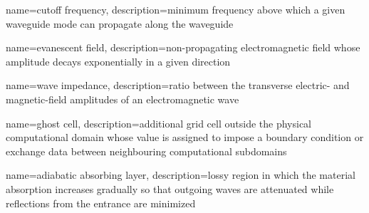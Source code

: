 { name={cutoff frequency}, description={minimum frequency above which a given waveguide mode can propagate along the waveguide} }

{ name={evanescent field}, description={non-propagating electromagnetic field whose amplitude decays exponentially in a given direction} }

{ name={wave impedance}, description={ratio between the transverse electric- and magnetic-field amplitudes of an electromagnetic wave} }

{ name={ghost cell}, description={additional grid cell outside the physical computational domain whose value is assigned to impose a boundary condition or exchange data between neighbouring computational subdomains} }

{ name={adiabatic absorbing layer}, description={lossy region in which the material absorption increases gradually so that outgoing waves are attenuated while reflections from the entrance are minimized} }

